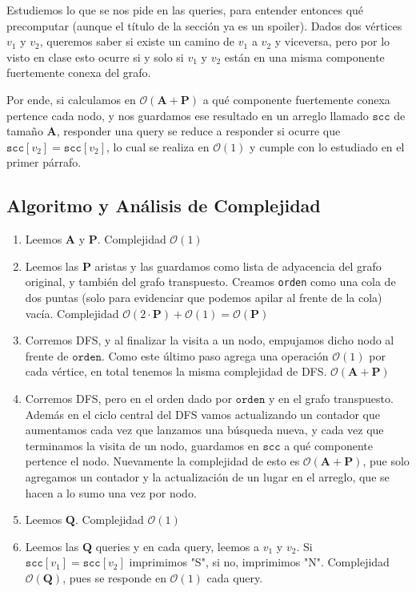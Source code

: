 Estudiemos lo que se nos pide en las queries, para entender entonces qué precomputar (aunque el título de la sección ya es un spoiler). Dados dos vértices $v_1$ y $v_2$, queremos saber si existe un camino de $v_1$ a $v_2$ y viceversa, pero por lo visto en clase esto ocurre si y solo si $v_1$ y $v_2$ están en una misma componente fuertemente conexa del grafo.

Por ende, si calculamos en $\mathcal{O}(\textbf{A} + \textbf{P})$ a qué componente fuertemente conexa pertence cada nodo, y nos guardamos ese resultado en un arreglo llamado $\texttt{scc}$ de tamaño $\textbf{A}$, responder una query se reduce a responder si ocurre que $\texttt{scc}[v_2] = \texttt{scc}[v_2]$, lo cual se realiza en $\mathcal{O}(1)$ y cumple con lo estudiado en el primer párrafo.

\subsection{Algoritmo y Análisis de Complejidad}

\begin{enumerate}
	\item Leemos $\textbf{A}$ y $\textbf{P}$. Complejidad $\mathcal{O}(1)$
	\item Leemos las $\textbf{P}$ aristas y las guardamos como lista de adyacencia del grafo original, y también del grafo transpuesto. Creamos \texttt{orden} como una cola de dos puntas (solo para evidenciar que podemos apilar al frente de la cola) vacía. Complejidad $\mathcal{O}(2\cdot \textbf{P}) + \mathcal{O}(1) = \mathcal{O}(\textbf{P})$
	\item Corremos DFS, y al finalizar la visita a un nodo, empujamos dicho nodo al frente de $\texttt{orden}$. Como este último paso agrega una operación $\mathcal{O}(1)$ por cada vértice, en total tenemos la misma complejidad de DFS. $\mathcal{O}(\textbf{A} + \textbf{P})$ 
	\item Corremos DFS, pero en el orden dado por $\texttt{orden}$ y en el grafo transpuesto. Además en el ciclo central del DFS vamos actualizando un contador que aumentamos cada vez que lanzamos una búsqueda nueva, y cada vez que terminamos la visita de un nodo, guardamos en $\texttt{scc}$ a qué componente pertence el nodo. Nuevamente la complejidad de esto es $\mathcal{O}(\textbf{A} + \textbf{P})$, pue solo agregamos un contador y la actualización de un lugar en el arreglo, que se hacen a lo sumo una vez por nodo.
	\item Leemos $\textbf{Q}$. Complejidad $\mathcal{O}(1)$
	\item Leemos las $\textbf{Q}$ queries y en cada query, leemos a $v_1$ y $v_2$. Si $\texttt{scc}[v_1] = \texttt{scc}[v_2]$ imprimimos "S", si no, imprimimos "N". Complejidad $\mathcal{O}(\textbf{Q})$, pues se responde en $\mathcal{O}(1)$ cada query.
\end{enumerate}

